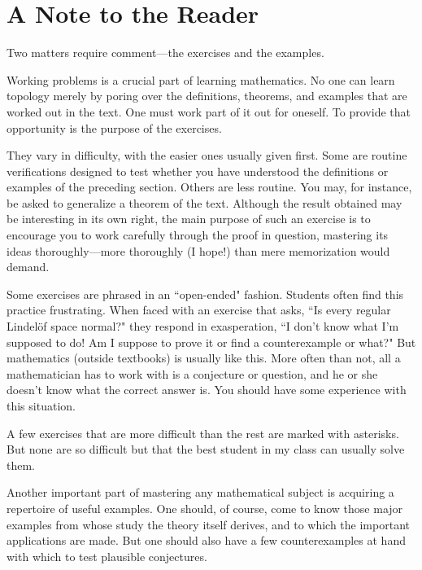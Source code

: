 \chapter*{A Note to the Reader}
\vspace{6.5cm}
Two matters require comment---the exercises and the examples.

Working problems is a crucial part of learning mathematics. 
No one can learn topology merely by poring over the definitions, theorems, 
and examples that are worked out in the text. One must work part of it out for 
oneself. To provide that opportunity is the purpose of the exercises.

They vary in difficulty, with the easier ones usually given first. Some are 
routine verifications designed to test whether you have understood the definitions 
or examples of the preceding section. Others are less routine. 
You may, for instance, be asked to generalize a theorem of the text. 
Although the result obtained may be interesting in its own right, 
the main purpose of such an exercise is to encourage you to work carefully 
through the proof in question, mastering its ideas thoroughly---more thoroughly 
(I hope!) than mere memorization would demand.

Some exercises are phrased in an ``open-ended" fashion. Students often find 
this practice frustrating. When faced with an exercise that asks, 
``Is every regular Lindelöf space normal?" they respond in exasperation, 
``I don't know what I'm supposed to do! Am I suppose to prove it or find a 
counterexample or what?" But mathematics (outside textbooks) is usually like 
this. More often than not, all a mathematician has to work with is a conjecture 
or question, and he or she doesn't know what the correct answer is. 
You should have some experience with this situation.

A few exercises that are more difficult than the rest are marked with asterisks.
But none are so difficult but that the best student in my class can usually solve them.

Another important part of mastering any mathematical subject is acquiring a 
repertoire of useful examples. One should, of course, come to know those major 
examples from whose study the theory itself derives, and to which the important 
applications are made. But one should also have a few counterexamples at hand 
with which to test plausible conjectures.

